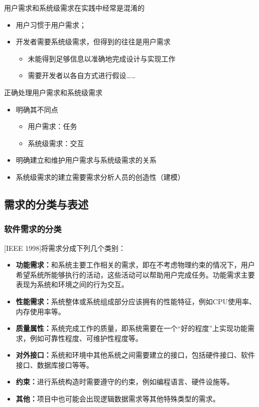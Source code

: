 用户需求和系统级需求在实践中经常是混淆的
\begin{itemize}
    \item 用户习惯于用户需求；
    \item 开发者需要系统级需求，但得到的往往是用户需求
    \begin{itemize}
        \item 未能得到足够信息以准确地完成设计与实现工作
        \item 需要开发者以各自方式进行假设……
    \end{itemize}
\end{itemize}

正确处理用户需求和系统级需求
\begin{itemize}
    \item 明确其不同点
    \vspace{-0.8em}
	\begin{multicols}{2}
    \begin{itemize}
        \item 用户需求：任务
        \item 系统级需求：交互
    \end{itemize}
	\end{multicols}
	\vspace{-1em}
    \item 明确建立和维护用户需求与系统级需求的关系
    \item 系统级需求的建立需要需求分析人员的创造性（建模）
\end{itemize}

\subsection{需求的分类与表述}

\subsubsection{软件需求的分类}
[IEEE 1998]将需求分成下列几个类别：
\begin{itemize}
    \item \textbf{功能需求：}和系统主要工作相关的需求，即在不考虑物理约束的情况下，用户希望系统所能够执行的活动，这些活动可以帮助用户完成任务。功能需求主要表现为系统和环境之间的行为交互。
    \item \textbf{性能需求：}系统整体或系统组成部分应该拥有的性能特征，例如CPU使用率、内存使用率等。
    \item \textbf{质量属性：}系统完成工作的质量，即系统需要在一个“好的程度”上实现功能需求，例如可靠性程度、可维护性程度等。
    \item \textbf{对外接口：}系统和环境中其他系统之间需要建立的接口，包括硬件接口、软件接口、数据库接口等等。
    \item \textbf{约束：}进行系统构造时需要遵守的约束，例如编程语言、硬件设施等。
    \item \textbf{其他：}项目中也可能会出现逻辑数据需求等其他特殊类型的需求。
\end{itemize}

